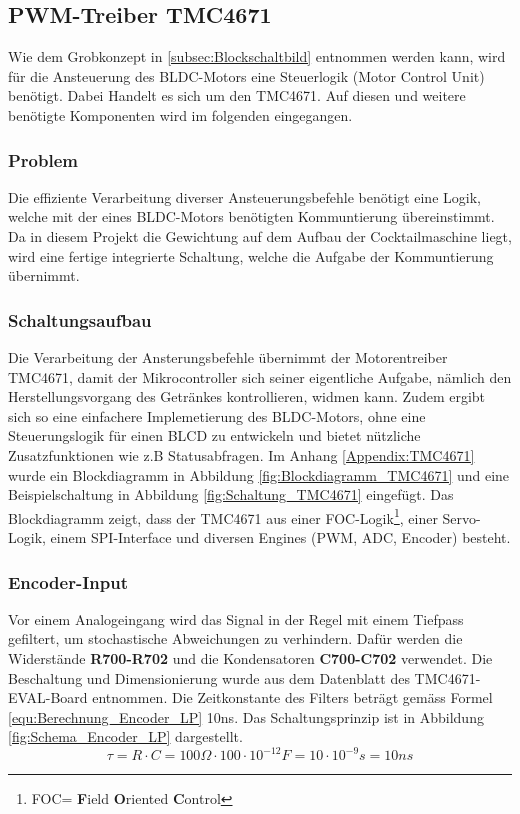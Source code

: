 \subsection{PWM-Treiber TMC4671}\label{subsec:Detailkonzept_PWM_Treiber}
Wie dem Grobkonzept in \ref{subsec:Blockschaltbild} entnommen werden kann, wird für die Ansteuerung des BLDC-Motors eine Steuerlogik (Motor Control Unit) benötigt. Dabei Handelt es sich um den TMC4671. Auf diesen und weitere benötigte Komponenten wird im folgenden eingegangen.
\subsubsection{Problem}\label{subsubsec:Problem_TMC4671}

Die effiziente Verarbeitung diverser Ansteuerungsbefehle benötigt eine Logik, welche mit der eines BLDC-Motors benötigten Kommuntierung übereinstimmt. Da in diesem Projekt die Gewichtung auf dem Aufbau der Cocktailmaschine liegt, wird eine fertige integrierte Schaltung, welche die Aufgabe der Kommuntierung übernimmt.

\subsubsection{Schaltungsaufbau}\label{subsubsec:Schaltungsaufbau_TMC4671}

Die Verarbeitung der Ansterungsbefehle übernimmt der Motorentreiber TMC4671, damit der Mikrocontroller sich seiner eigentliche Aufgabe, nämlich den Herstellungsvorgang des Getränkes kontrollieren, widmen kann.
Zudem ergibt sich so eine einfachere Implemetierung des BLDC-Motors, ohne eine Steuerungslogik für einen BLCD zu entwickeln und bietet nützliche Zusatzfunktionen wie z.B Statusabfragen.
Im Anhang \ref{Appendix:TMC4671} wurde ein Blockdiagramm in Abbildung \ref{fig:Blockdiagramm_TMC4671} und eine Beispielschaltung in Abbildung \ref{fig:Schaltung_TMC4671} eingefügt. Das Blockdiagramm zeigt, dass der TMC4671 aus einer FOC-Logik\footnote{FOC= \textbf{F}ield \textbf{O}riented \textbf{C}ontrol}, einer Servo-Logik, einem SPI-Interface und diversen Engines (PWM, ADC, Encoder) besteht.
\subsubsection{Encoder-Input}\label{subsubsec:Encoder_Input}

Vor einem Analogeingang wird das Signal in der Regel mit einem Tiefpass gefiltert, um stochastische Abweichungen zu verhindern. Dafür werden die Widerstände \textbf{R700-R702} und die Kondensatoren \textbf{C700-C702} verwendet. Die Beschaltung und Dimensionierung wurde aus dem Datenblatt des TMC4671-EVAL-Board entnommen. Die Zeitkonstante des Filters beträgt gemäss Formel \ref{equ:Berechnung_Encoder_LP} 10ns. Das Schaltungsprinzip ist in Abbildung \ref{fig:Schema_Encoder_LP} dargestellt. 
\begin{equation}
\tau = R \cdot C = 100\Omega \cdot 100\cdot10^{-12}F = 10 \cdot 10^{-9}s = 10ns
\label{equ:Berechnung_Encoder_LP}
\end{equation}

